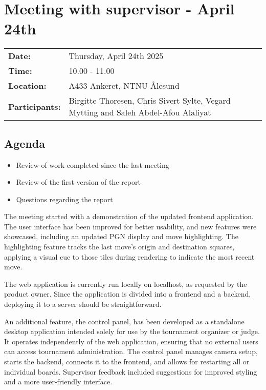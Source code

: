 \section{Meeting with supervisor - April 24th}
\begin{tabular}{ll}
    \textbf{Date:} & Thursday, April 24th 2025 \\
    \textbf{Time:} & 10.00 - 11.00\\
    \textbf{Location:} & A433 Ankeret, NTNU Ålesund \\
    \textbf{Participants:} & Birgitte Thoresen, Chris Sivert Sylte, Vegard Mytting and Saleh Abdel-Afou Alaliyat\\
\end{tabular}

\vspace{0.5cm}

\subsection{Agenda}

\begin{itemize} 
    \item Review of work completed since the last meeting
    \item Review of the first version of the report
    \item Questions regarding the report
\end{itemize}

The meeting started with a demonstration of the updated frontend application. The user interface has been improved for better usability, and new features were showcased, including an updated PGN display and move highlighting. The highlighting feature tracks the last move’s origin and destination squares, applying a visual cue to those tiles during rendering to indicate the most recent move.

The web application is currently run locally on localhost, as requested by the product owner. Since the application is divided into a frontend and a backend, deploying it to a server should be straightforward.

An additional feature, the control panel, has been developed as a standalone desktop application intended solely for use by the tournament organizer or judge. It operates independently of the web application, ensuring that no external users can access tournament administration. The control panel manages camera setup, starts the backend, connects it to the frontend, and allows for restarting all or individual boards. Supervisor feedback included suggestions for improved styling and a more user-friendly interface.

